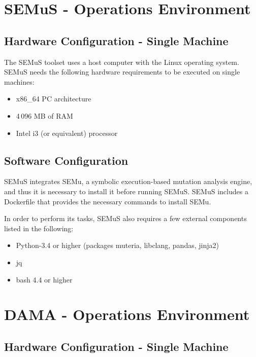 \chapter{SEMuS - Operations Environment}
\label{chapter:operations:semus}

\section{Hardware Configuration - Single Machine}

The SEMuS toolset uses a host computer with the Linux operating system. SEMuS needs the following hardware requirements to be executed on single machines:

\begin{itemize}
	\item x86\_64 PC architecture
	\item 4\,096 MB of RAM
	\item Intel i3 (or equivalent) processor
\end{itemize}


\section{Software Configuration}

SEMuS integrates SEMu, a symbolic execution-based mutation analysis engine, and thus it is necessary to install it before running SEMuS. SEMuS includes a Dockerfile that provides the necessary commands to install SEMu.

In order to perform its tasks, SEMuS also requires a few external components listed in the following:

\begin{itemize}
	\item Python-3.4 or higher (packages muteria, libclang, pandas, jinja2)
	\item jq
	\item bash 4.4 or higher
\end{itemize}


\chapter{DAMA - Operations Environment}
\label{chapter:dama:operationsEnv}

\section{Hardware Configuration - Single Machine}

